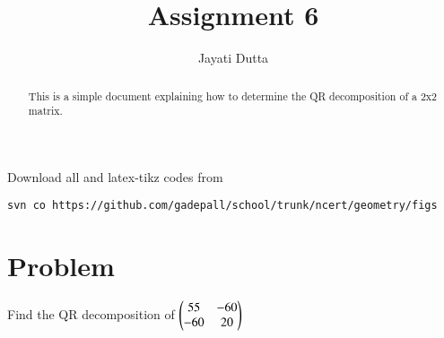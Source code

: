 \documentclass[journal,12pt,twocolumn]{IEEEtran}
\begin{document}
\let\StandardTheFigure\thefigure
\let\vec\mathbf
\renewcommand{\thefigure}{\theproblem}



\def\putbox#1#2#3{\makebox[0in][l]{\makebox[#1][l]{}\raisebox{\baselineskip}[0in][0in]{\raisebox{#2}[0in][0in]{#3}}}}
     \def\rightbox#1{\makebox[0in][r]{#1}}
     \def\centbox#1{\makebox[0in]{#1}}
     \def\topbox#1{\raisebox{-\baselineskip}[0in][0in]{#1}}
     \def\midbox#1{\raisebox{-0.5\baselineskip}[0in][0in]{#1}}

\vspace{3cm}


\title{Assignment 6}
\author{Jayati Dutta}





\maketitle

\newpage


\bigskip

\renewcommand{\thefigure}{\theenumi}
\renewcommand{\thetable}{\theenumi}


\begin{abstract}
This is a simple document explaining how to determine the QR decomposition of a 2x2 matrix.
\end{abstract}

%

Download all and latex-tikz codes from 
%
\begin{lstlisting}
svn co https://github.com/gadepall/school/trunk/ncert/geometry/figs
\end{lstlisting}
%


\section{Problem}
Find the QR decomposition of $\begin{pmatrix}55 & -60\\-60 & 20\end{pmatrix}$
\end{document}
